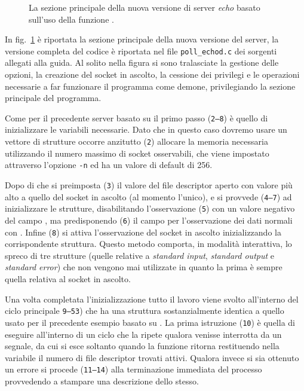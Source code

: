 \begin{figure}[!htbp]
  \footnotesize \centering
  \begin{minipage}[c]{\codesamplewidth}
  \end{minipage} 
  \normalsize
  \caption{La sezione principale della nuova versione di server
    \textit{echo} basato sull'uso della funzione .}
  \label{fig:TCP_PollEchod}
\end{figure}

In fig.~\ref{fig:TCP_PollEchod} è riportata la sezione principale della nuova
versione del server, la versione completa del codice è riportata nel file
\texttt{poll\_echod.c} dei sorgenti allegati alla guida. Al solito nella
figura si sono tralasciate la gestione delle opzioni, la creazione del socket
in ascolto, la cessione dei privilegi e le operazioni necessarie a far
funzionare il programma come demone, privilegiando la sezione principale del
programma.

Come per il precedente server basato su  il primo passo
(\texttt{\small 2--8}) è quello di inizializzare le variabili necessarie. Dato
che in questo caso dovremo usare un vettore di strutture occorre anzitutto
(\texttt{\small 2}) allocare la memoria necessaria utilizzando il numero
massimo  di socket osservabili, che viene impostato attraverso
l'opzione \texttt{-n} ed ha un valore di default di 256. 

Dopo di che si preimposta (\texttt{\small 3}) il valore  del file
descriptor aperto con valore più alto a quello del socket in ascolto (al
momento l'unico), e si provvede (\texttt{\small 4--7}) ad inizializzare le
strutture, disabilitando l'osservazione (\texttt{\small 5}) con un valore
negativo del campo , ma predisponendo (\texttt{\small 6}) il campo
 per l'osservazione dei dati normali con .
Infine (\texttt{\small 8}) si attiva l'osservazione del socket in ascolto
inizializzando la corrispondente struttura. Questo metodo comporta, in
modalità interattiva, lo spreco di tre strutture (quelle relative a
\textit{standard input}, \textit{standard output} e \textit{standard error})
che non vengono mai utilizzate in quanto la prima è sempre quella relativa al
socket in ascolto.

Una volta completata l'inizializzazione tutto il lavoro viene svolto
all'interno del ciclo principale \texttt{\small 9--53}) che ha una struttura
sostanzialmente identica a quello usato per il precedente esempio basato su
. La prima istruzione (\texttt{\small 10}) è quella di eseguire
 all'interno di un ciclo che la ripete qualora venisse interrotta
da un segnale, da cui si esce soltanto quando la funzione ritorna restituendo
nella variabile  il numero di file descriptor trovati attivi.  Qualora
invece si sia ottenuto un errore si procede (\texttt{\small 11--14}) alla
terminazione immediata del processo provvedendo a stampare una descrizione
dello stesso.

